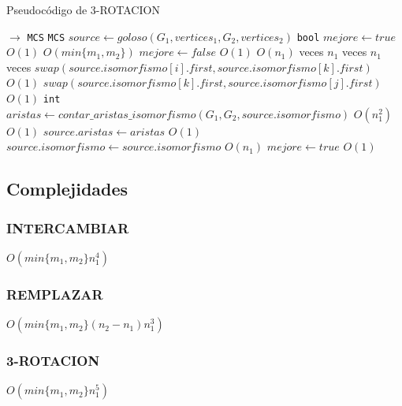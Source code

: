 \begin{algorithm}[H]
  \small
  \begin{algorithmic}[1]
  \caption{Pseudocódigo de 3-ROTACION}
  \label{algo:1-1}
    $\rightarrow$ \texttt{MCS}
      \State \texttt{MCS} $source \gets goloso(G_1, vertices_1, G_2, vertices_2)$
      \State \texttt{bool} $mejore \gets true$
      \Comment $O(1)$
      \Comment $O(min\{m_1, m_2\})$
        \State $mejore \gets false$
        \Comment $O(1)$
        \Comment $O(n_1)$ veces
          \Comment $n_1$ veces
            \Comment $n_1$ veces
              \State $swap(source.isomorfismo[i].first, source.isomorfismo[k].first)$
              \Comment $O(1)$
              \State $swap(source.isomorfismo[k].first, source.isomorfismo[j].first)$
              \Comment $O(1)$
              \State \texttt{int} $aristas \gets contar\_aristas\_isomorfismo(G_1, G_2, source.isomorfismo)$
              \Comment $O(n_1^2)$
              \Comment $O(1)$
                \State $source.aristas \gets aristas$ 
                \Comment $O(1)$             
                \State $source.isomorfismo \gets source.isomorfismo$
                \Comment $O(n_1)$
                \State $mejore \gets true$
                \Comment $O(1)$
              \EndIf
            \EndFor
          \EndFor
        \EndFor
      \EndWhile
    \EndProcedure
  \end{algorithmic}
\end{algorithm}

\subsection{Complejidades}
\subsubsection{INTERCAMBIAR}
$O(min\{m_1, m_2\}n_1^4)$

\subsubsection{REMPLAZAR}
$O(min\{m_1, m_2\}(n_2-n_1) n_1^3)$

\subsubsection{3-ROTACION}
$O(min\{m_1, m_2\}n_1^5)$

